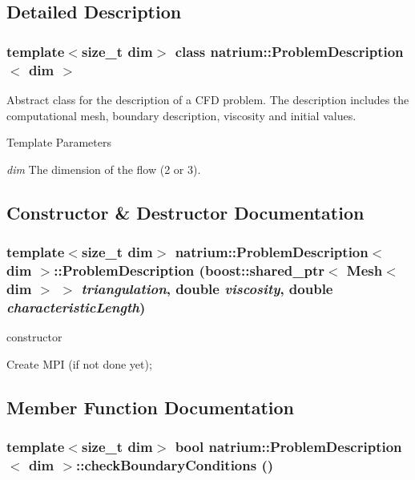 \subsection{Detailed Description}
\subsubsection*{template$<$size\_\-t dim$>$ class natrium::ProblemDescription$<$ dim $>$}

Abstract class for the description of a CFD problem. The description includes the computational mesh, boundary description, viscosity and initial values. 
\begin{DoxyTemplParams}{Template Parameters}
\item[{\em dim}]The dimension of the flow (2 or 3). \end{DoxyTemplParams}


\subsection{Constructor \& Destructor Documentation}
\hypertarget{classnatrium_1_1ProblemDescription_afc92659d0022799b4e846cf050e8efad}{
\subsubsection[{ProblemDescription}]{\setlength{\rightskip}{0pt plus 5cm}template$<$size\_\-t dim$>$ {\bf natrium::ProblemDescription}$<$ dim $>$::{\bf ProblemDescription} (boost::shared\_\-ptr$<$ Mesh$<$ dim $>$ $>$ {\em triangulation}, \/  double {\em viscosity}, \/  double {\em characteristicLength})}}
\label{classnatrium_1_1ProblemDescription_afc92659d0022799b4e846cf050e8efad}


constructor 

Create MPI (if not done yet); 

\subsection{Member Function Documentation}
\hypertarget{classnatrium_1_1ProblemDescription_aed8ec93fcba6c0b78c04ef91b8703f7a}{
\subsubsection[{checkBoundaryConditions}]{\setlength{\rightskip}{0pt plus 5cm}template$<$size\_\-t dim$>$ bool {\bf natrium::ProblemDescription}$<$ dim $>$::checkBoundaryConditions ()}}
\label{classnatrium_1_1ProblemDescription_aed8ec93fcba6c0b78c04ef91b8703f7a}


